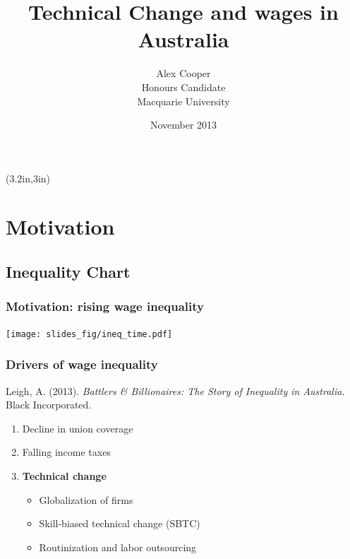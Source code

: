 \documentclass[red]{beamer}
\title[Technical Change and Wages]{Technical Change and wages in Australia}
\author{Alex Cooper \\ Honours Candidate \\ Macquarie University}
\date{November 2013}
\newcommand{\vitem}{\vfill\item}
\begin{document}
%
\begin{frame}[plain]
\titlepage
\begin{textblock*}{\textwidth}(3.2in,3in) 
\end{textblock*} 
\end{frame}

\section{Motivation}

\subsection{Inequality Chart}
\begin{frame}[c]
\frametitle{Motivation: rising wage inequality}
\begin{center}
  \texttt{[image: slides\_fig/ineq\_time.pdf]}
\end{center}
\end{frame}

\begin{frame}[c]
\frametitle{Drivers of wage inequality}
Leigh, A. (2013). \emph{Battlers \& Billionaires: The Story of Inequality in Australia.} Black Incorporated.
\begin{enumerate}
\vitem Decline in union coverage
\vitem Falling income taxes
\vitem {\bf Technical change}
\pause
\begin{itemize}
  \vitem Globalization of firms
  \vitem Skill-biased technical change (SBTC)
  \vitem Routinization and labor outsourcing
\end{itemize}
\end{enumerate}
\end{frame}
\end{document}
